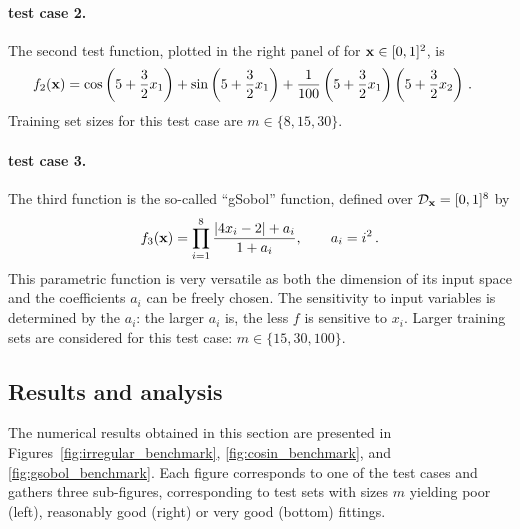 \paragraph{test case 2.}

The second test function, plotted in the right panel of  for ${\bf x}\in[0,1]^2$, is 
\begin{align*}
   f_2({\bf x}) 
   &= \cos \left(5 + \frac{3}{2}x_1 \right) + \sin \left(5 + \frac{3}{2}x_1 \right) 
   + \frac{1}{100} \left(5 + \frac{3}{2}x_1 \right) \left(5 + \frac{3}{2}x_2 \right)\,.
\end{align*}
Training set sizes for this test case are $m\in\{8, 15, 30\}$.

\paragraph{test case 3.}

The third function is the so-called ``gSobol'' function, defined over $\mathcal{D}_{\bf x}=[0,1]^8$ by
\begin{equation*}
  f_3({\bf x}) = \prod_{i=1}^{8} \frac{|4x_i - 2| + a_i}{1 + a_i}, \qquad a_i = i^2 \,.
\end{equation*}
This parametric function is very versatile as both the dimension of its input space and the coefficients $a_i$ can be freely chosen. 
The sensitivity to input variables is determined by the $a_i$: the larger $a_i$ is, the less $f$ is sensitive to $x_i$. 
Larger training sets are considered for this test case: $m\in\{15, 30, 100\}$.

\subsection{Results and analysis}

The numerical results obtained in this section are presented in Figures~\ref{fig:irregular_benchmark}, \ref{fig:cosin_benchmark}, and \ref{fig:gsobol_benchmark}. 
Each figure corresponds to one of the test cases and gathers three sub-figures, corresponding to test sets with sizes $m$ yielding poor (left), reasonably good (right) or very good (bottom) fittings. 
 
